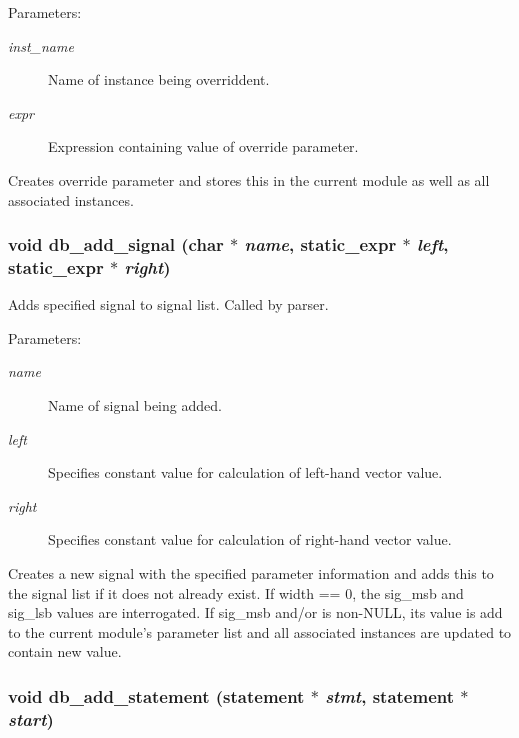 \begin{Desc}
\item[Parameters:]
\begin{description}
\item[{\em inst\_\-name}]Name of instance being overriddent. \item[{\em expr}]Expression containing value of override parameter.\end{description}
\end{Desc}
Creates override parameter and stores this in the current module as well as all associated instances. 
\subsubsection{\setlength{\rightskip}{0pt plus 5cm}void db\_\-add\_\-signal (char $\ast$ {\em name}, {\bf static\_\-expr} $\ast$ {\em left}, {\bf static\_\-expr} $\ast$ {\em right})}\label{db_8h_a8}


Adds specified signal to signal list. Called by parser. 

\begin{Desc}
\item[Parameters:]
\begin{description}
\item[{\em name}]Name of signal being added. \item[{\em left}]Specifies constant value for calculation of left-hand vector value. \item[{\em right}]Specifies constant value for calculation of right-hand vector value.\end{description}
\end{Desc}
Creates a new signal with the specified parameter information and adds this to the signal list if it does not already exist. If width == 0, the sig\_\-msb and sig\_\-lsb values are interrogated. If sig\_\-msb and/or is non-NULL, its value is add to the current module's parameter list and all associated instances are updated to contain new value. 
\subsubsection{\setlength{\rightskip}{0pt plus 5cm}void db\_\-add\_\-statement ({\bf statement} $\ast$ {\em stmt}, {\bf statement} $\ast$ {\em start})}\label{db_8h_a14}


